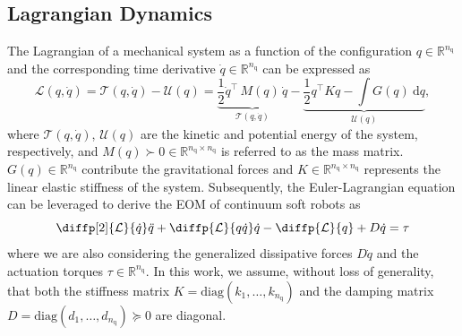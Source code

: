 \subsection{Lagrangian Dynamics}\label{sub:pcsregression:lagr_dynamics}
The Lagrangian of a mechanical system as a function of the configuration $q \in \mathbb{R}^{n_\mathrm{q}}$ and the corresponding time derivative $\dot{q} \in \mathbb{R}^{n_\mathrm{q}}$ can be expressed as
\begin{equation}
    \mathcal{L}(q, \dot{q}) = \mathcal{T}(q, \dot{q}) - \mathcal{U}(q) = \underbrace{\frac{1}{2}\dot{q}^\top \, M(q) \, \dot{q}}_{\mathcal{T}(q, \dot{q})} - \underbrace{\frac{1}{2} q^\top K q - \int G(q) \: \mathrm{d}q}_{\mathcal{U}(q)},
\end{equation}
where $\mathcal{T}(q, \dot{q})$, $\mathcal{U}(q)$ are the kinetic and potential energy of the system, respectively, and $M(q) \succ 0 \in \mathbb{R}^{n_\mathrm{q} \times n_\mathrm{q}}$ is referred to as the mass matrix. $G(q) \in \mathbb{R}^{n_\mathrm{q}}$ contribute the gravitational forces and $K \in \mathbb{R}^{n_\mathrm{q} \times n_\mathrm{q}}$ represents the linear elastic stiffness of the system.
Subsequently, the Euler-Lagrangian equation can be leveraged to derive the \gls{EOM} of continuum soft robots as~\cite{della2023model, liu2024physics}
\begin{equation}
    \diffp[2]{\mathcal{L}}{{\dot{q}}}\ddot{q} + \diffp{\mathcal{L}}{{q}{\dot{q}}}\dot{q} - \diffp{\mathcal{L}}{{q}} + D\dot{q} = \tau
\end{equation}
where we are also considering the generalized dissipative forces $D\dot{q}$ and the actuation torques $\tau \in \mathbb{R}^{n_\mathrm{q}}$. 
In this work, we assume, without loss of generality, that both the stiffness matrix $K = \mathrm{diag}(k_1, \dots, k_{n_\mathrm{q}})$ and the damping matrix $D = \mathrm{diag}(d_1, \dots, d_{n_\mathrm{q}}) \succeq 0$ are diagonal.

